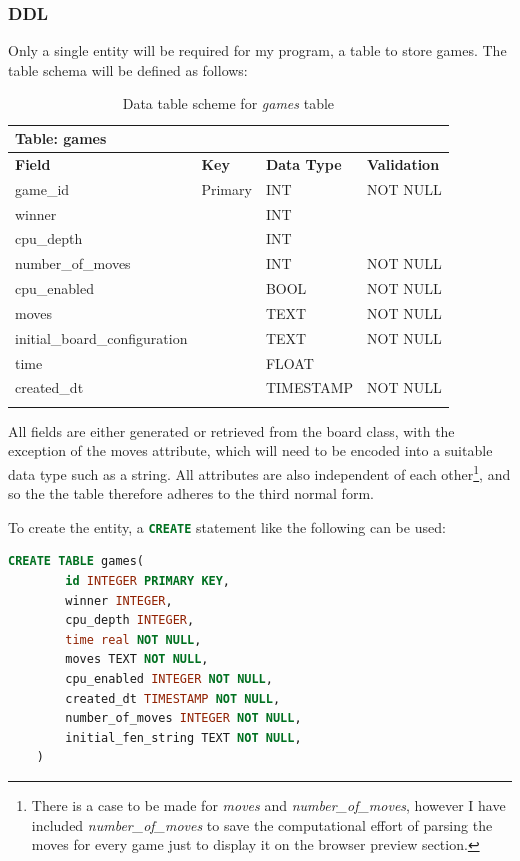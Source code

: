 \documentclass[../main/main.tex]{subfiles}
\begin{document}
\subsubsection*{DDL}
Only a single entity will be required for my program, a table to store games. The table schema will be defined as follows:

\begin{longtable}[c]{l|l|l|l}
    \multicolumn{4}{l}{\textbf{Table: games}}\\
    \toprule
    \textbf{Field} & \textbf{Key} & \textbf{Data Type} & \textbf{Validation}\\
    \midrule
    \endfirsthead
    \endhead

    game\_id & Primary & INT & NOT NULL\\
    winner &  & INT & \\
    cpu\_depth &  & INT & \\
    number\_of\_moves &  & INT & NOT NULL\\
    cpu\_enabled &  & BOOL & NOT NULL\\
    moves &  & TEXT & NOT NULL\\
    initial\_board\_configuration &  & TEXT & NOT NULL\\
    time &  & FLOAT & \\
    created\_dt &  & TIMESTAMP & NOT NULL\\

    \bottomrule
    
\caption{Data table scheme for \textit{games} table}
\label{tab:games-schema}
\end{longtable}

All fields are either generated or retrieved from the board class, with the exception of the moves attribute, which will need to be encoded into a suitable data type such as a string. All attributes are also independent of each other\footnote{There is a case to be made for \textit{moves} and \textit{number\_of\_moves}, however I have included \textit{number\_of\_moves} to save the computational effort of parsing the moves for every game just to display it on the browser preview section.}, and so the the table therefore adheres to the third normal form.

To create the entity, a \lstinline[language=SQL]{CREATE} statement like the following can be used:

\begin{lstlisting}[language=SQL, frame=single]
    CREATE TABLE games(
        id INTEGER PRIMARY KEY,
        winner INTEGER,
        cpu_depth INTEGER,
        time real NOT NULL,
        moves TEXT NOT NULL,
        cpu_enabled INTEGER NOT NULL,
        created_dt TIMESTAMP NOT NULL,
        number_of_moves INTEGER NOT NULL,
        initial_fen_string TEXT NOT NULL,
    )
\end{lstlisting}
\end{document}
